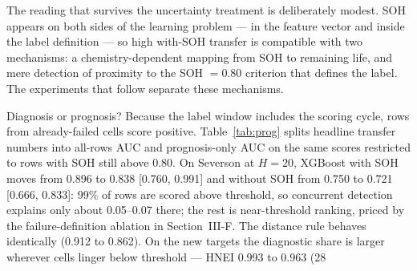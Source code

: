 \documentclass[preprint,12pt]{elsarticle}
\begin{document}
\begin{table}[!t]
\caption{GRU Transfer at H=20 on the Common Feature Set: Seed-Averaged Per-Cell AUC ($\pm$ SD Over Seeds 42, 1, 7).}
\label{tab:gru}
\centering
\small
{}
\end{table}

The reading that survives the uncertainty treatment is deliberately modest. SOH appears on both sides of the learning problem --- in the feature vector and inside the label definition --- so high with-SOH transfer is compatible with two mechanisms: a chemistry-dependent mapping from SOH to remaining life, and mere detection of proximity to the SOH $=0.80$ criterion that defines the label. The experiments that follow separate these mechanisms.

Diagnosis or prognosis? Because the label window includes the scoring cycle, rows from already-failed cells score positive. Table~\ref{tab:prog} splits headline transfer numbers into all-rows AUC and prognosis-only AUC on the same scores restricted to rows with SOH still above 0.80. On Severson at $H{=}20$, XGBoost with SOH moves from 0.896 to 0.838 [0.760, 0.991] and without SOH from 0.750 to 0.721 [0.666, 0.833]: 99\% of rows are scored above threshold, so concurrent detection explains only about 0.05--0.07 there; the rest is near-threshold ranking, priced by the failure-definition ablation in Section~III-F. The distance rule behaves identically (0.912 to 0.862). On the new targets the diagnostic share is larger wherever cells linger below threshold --- HNEI 0.993 to 0.963 (28%
\end{document}
